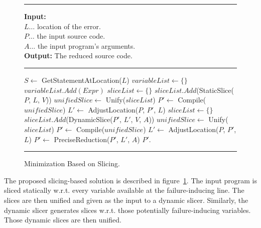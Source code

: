 \begin{figure}[h]
	\hrule height.8pt depth0pt \kern2pt
	\textbf{Input:} \\
	\hspace*{\algorithmicindent} $L \ldots$ location of the error. \\
	\hspace*{\algorithmicindent} $P \ldots$ the input source code. \\
	\hspace*{\algorithmicindent} $A \ldots$ the input program's arguments. \\
	\textbf{Output:} The reduced source code. 
	\hrule height.8pt depth0pt \kern2pt
	\begin{algorithmic}[1]
		\State $S \leftarrow$ GetStatementAtLocation($L$)
		\State $variableList \leftarrow \{\}$
				\State $variableList.Add(Expr)$
			\EndIf
		\EndFor
		\State $sliceList \leftarrow \{\}$
			\State $sliceList.Add$(StaticSlice($P$, $L$, $V$))
		\EndFor
		\State $unifiedSlice \leftarrow$ Unify($sliceList$)
		\State $P' \leftarrow$ Compile($unifiedSlice$)
		\State $L' \leftarrow$ AdjustLocation($P$, $P'$, $L$)
		\State $sliceList \leftarrow \{\}$
			\State $sliceList.Add$(DynamicSlice($P'$, $L'$, $V$, $A$))
		\EndFor
		\State $unifiedSlice \leftarrow$ Unify($sliceList$)
		\State $P' \leftarrow$ Compile($unifiedSlice$)
		\State $L' \leftarrow$ AdjustLocation($P$, $P'$, $L$)
		\State $P' \leftarrow$ PreciseReduction($P'$, $L'$, $A$)
		\State \Return $P'$.
	\end{algorithmic} 
	\hrule height.8pt depth0pt \kern2pt
	\caption{Minimization Based on Slicing.} 
	\label{alg:slicing}
\end{figure}

The proposed slicing-based solution is described in figure~\ref{alg:slicing}.
The input program is sliced statically w.r.t.
every variable available at the failure-inducing line.
The slices are then unified and given as the input to a dynamic slicer.
Similarly, the dynamic slicer generates slices w.r.t.
those potentially failure-inducing variables.
Those dynamic slices are then unified.

